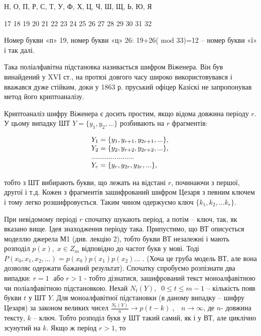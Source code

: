 \documentclass[a4paper]{article}
\newcounter{}
\begin{document}
 Н,   О,   П,   Р,   С,  Т,   У,   Ф,   Х,   Ц,  Ч,   Ш,  Щ,  Ь,   Ю,   Я

  17   18   19  20  21  22   23   24   25  26  27   28  29  30  31  32


\bigskip

 Номер букви «п» 19, номер букви «ц» 26:  19+26( ${\text{mod}}$ 33)=12 – номер
букви «ї» і так далі.

Така поліалфавітна  підстановка називається шифром Віженера. Він був винайдений
у XVI\textit{ }ст., на протязі довгого часу широко використовувався і вважався
дуже стійким, доки у 1863 р. пруський офіцер Казіскі не запропонував метод його
криптоаналізу. 

Криптоаналіз шифру Віженера є досить простим, якщо відома довжина періоду 
${r}$. У цьому випадку ШТ  ${Y=\{y_{{1}},y_{{2}},\text{.}\text{.}\text{.}\}}$
розбивають на  ${r}$ фрагментів:

\begin{equation*}
\begin{matrix}{Y_{{1}}=\{y_{{1}},y_{{r+1}},y_{{2r+1}},\text{.}\text{.}\text{.}\},}\hfill\null
\\Y_{{2}}=\{y_{{2}},y_{{r+2}},y_{{2r+2}},\text{.}\text{.}\text{.}\},\hfill\null
\\\text{.}\text{.}\text{.}\text{.}\text{.}\text{.}\text{.}\text{.}\text{.}\text{.}\text{.}\text{.}\text{.}\text{.}\text{.}\text{.}\text{.}\text{.}\text{.}\text{.}\text{.}\text{.}\hfill\null
\\Y_{{r}}=\{y_{{r}},y_{{2r}},y_{{3r}},\text{.}\text{.}\text{.}\},\hfill\null
\end{matrix}\hfill 
\end{equation*}

\bigskip

тобто з ШТ вибирають букви, що лежать на відстані  ${r}$, починаючи з першої,
другої і т.д. Кожен з фрагментів зашифрований шифром Цезаря з певним ключем і
тому легко розшифровується. Таким чином одержуємо ключ 
${\{k_{{1}},k_{{2}},\text{.}\text{.}\text{.}k_{{r}}\}}$. 

При невідомому періоді  ${r}$ спочатку шукають період, а потім – ключ, так, як
вказано вище. Ідея знаходження періоду така. Припустимо, що ВТ описується
моделлю джерела  М1 (див. лекцію 2), тобто букви ВТ незалежні і мають розподіл 
${p(x),\;x\in Z_{{m}}}$ відповідно до частот букв у мові. Тоді 
${P(x_{{0}},x_{{1}},x_{{2}},\text{.}\text{.}\text{.})=p(x_{{0}})p(x_{{1}})p(x_{{2}})\text{.}\text{.}\text{.}}$
. (Хоча це груба модель ВТ, але вона дозволяє одержати бажаний результат).
Спочатку спробуємо розпізнати два випадки:  ${r=1\;}$ або  ${r>1}$ - тобто
дізнатися, зашифрований текст моноалфавітною чи поліалфавітною підстановкою.
Нехай  ${N_{{t}}(Y),\;\;0\le t\le m-1}$ – кількість появ букви  ${t}$ у ШТ 
${Y}$. Для моноалфавітної підстановки (в даному випадку – шифру Цезаря) за
законом великих чисел  ${\frac{N_{{t}}(Y)}{n}\rightarrow
p(t-k)\;,\;\;\;n\rightarrow \infty }$, де  ${n}${}- довжина тексту,  ${k}$ –
ключ. Тобто розподіл букв у ШТ такий самий, як і у ВТ, але циклічно зсунутий на
 ${k}$. Якщо ж період  ${r>1}$, то 
\end{document}
